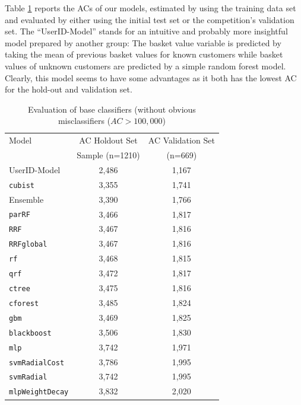 \documentclass[12pt]{article}
\begin{document}
Table \ref{tab:compres} reports the ACs of our models, estimated by using the training data set and evaluated by either using the initial test set or the competition's validation set. The ``UserID-Model'' stands for an intuitive and probably more insightful model prepared by another group: The basket value variable is predicted by taking the mean of previous basket values for known customers while basket values of unknown customers are predicted by a simple random forest model. Clearly, this model seems to have some advantages as it both has the lowest AC for the hold-out and validation set.\\
\begin{table}
	\centering
	\begin{tabular}{l|cc}
		\hline
		\hline
		Model & AC Holdout Set & AC Validation Set \\
		& Sample (n=1210)  &  (n=669) \\\hline
		UserID-Model & 2,486 & 1,167 \\
		\texttt{cubist} & 3,355 & 1,741\\
		Ensemble & 3,390 & 1,766 \\
		\texttt{parRF} & 3,466 & 1,817 \\
		\texttt{RRF} & 3,467 & 1,816\\
		\texttt{RRFglobal} & 3,467 & 1,816\\
		\texttt{rf} & 3,468 & 1,815\\
		\texttt{qrf} & 3,472 & 1,817\\
		\texttt{ctree} & 3,475 & 1,816\\
		\texttt{cforest} & 3,485 & 1,824\\
		\texttt{gbm }& 3,469 & 1,825\\
		\texttt{blackboost} & 3,506 & 1,830\\
		\texttt{mlp} & 3,742 & 1,971\\
		\texttt{svmRadialCost} & 3,786 & 1,995\\
		\texttt{svmRadial} & 3,742 & 1,995\\
		\texttt{mlpWeightDecay} & 3,832 & 2,020\\
		\hline
		\hline
	\end{tabular}
	\caption{Evaluation of base classifiers (without obvious misclassifiers ($AC > 100,000$)}
	\label{tab:compres}
\end{table}
\end{document}
